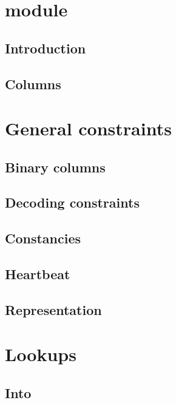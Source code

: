 \section{\blkMdxMod{} module}
\subsection{Introduction}                      \label{blake + modexp: intro}                        
\subsection{Columns}                           \label{blake + modexp: columns}                      

\section{General constraints}
\subsection{Binary columns}                    \label{blake + modexp: binary}                       
\subsection{Decoding constraints}              \label{blake + modexp: decoding}                     
\subsection{Constancies}                       \label{blake + modexp: constancies}                  
\subsection{Heartbeat}                         \label{blake + modexp: heartbeat}                    
\subsection{Representation}                    \label{blake + modexp: representation}               

\section{Lookups}
\subsection{Into \wcpMod{}}                    \label{blake + modexp: lookups: into wcp}            
                                                                                                    
